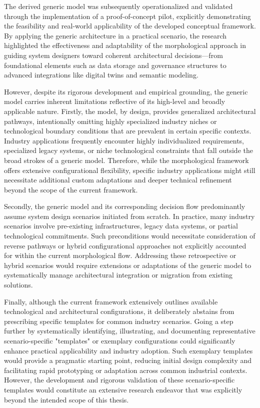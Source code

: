 The derived generic model was subsequently operationalized and validated through the implementation of a proof-of-concept pilot, explicitly demonstrating the feasibility and real-world applicability of the developed conceptual framework. By applying the generic architecture in a practical scenario, the research highlighted the effectiveness and adaptability of the morphological approach in guiding system designers toward coherent architectural decisions—from foundational elements such as data storage and governance structures to advanced integrations like digital twins and semantic modeling.

However, despite its rigorous development and empirical grounding, the generic model carries inherent limitations reflective of its high-level and broadly applicable nature. Firstly, the model, by design, provides generalized architectural pathways, intentionally omitting highly specialized industry niches or technological boundary conditions that are prevalent in certain specific contexts. Industry applications frequently encounter highly individualized requirements, specialized legacy systems, or niche technological constraints that fall outside the broad strokes of a generic model. Therefore, while the morphological framework offers extensive configurational flexibility, specific industry applications might still necessitate additional custom adaptations and deeper technical refinement beyond the scope of the current framework.

Secondly, the generic model and its corresponding decision flow predominantly assume system design scenarios initiated from scratch. In practice, many industry scenarios involve pre-existing infrastructures, legacy data systems, or partial technological commitments. Such preconditions would necessitate consideration of reverse pathways or hybrid configurational approaches not explicitly accounted for within the current morphological flow. Addressing these retrospective or hybrid scenarios would require extensions or adaptations of the generic model to systematically manage architectural integration or migration from existing solutions.

Finally, although the current framework extensively outlines available technological and architectural configurations, it deliberately abstains from prescribing specific templates for common industry scenarios. Going a step further by systematically identifying, illustrating, and documenting representative scenario-specific "templates" or exemplary configurations could significantly enhance practical applicability and industry adoption. Such exemplary templates would provide a pragmatic starting point, reducing initial design complexity and facilitating rapid prototyping or adaptation across common industrial contexts. However, the development and rigorous validation of these scenario-specific templates would constitute an extensive research endeavor that was explicitly beyond the intended scope of this thesis.

